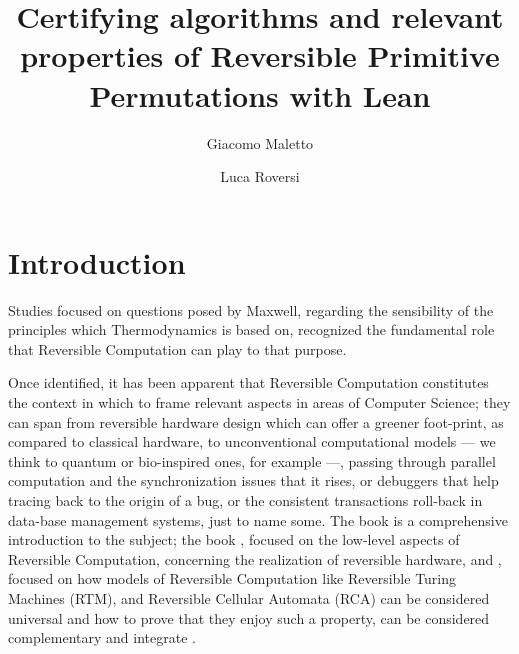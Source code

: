 \documentclass[runningheads]{llncs}
\newcommand{\RPP}{\textsf{RPP}\xspace}
\newcommand{\LEAN}{\textsf{Lean}\xspace}
\begin{document}
\title{Certifying algorithms and relevant properties of Reversible Primitive Permutations with \LEAN}
\titlerunning{Certifying \RPP properties with \LEAN}

\author{Giacomo Maletto \and
	    Luca Roversi}



\maketitle
\begin{abstract}
\end{abstract}

\section{Introduction}
\label{section:Introduction}
Studies focused on questions posed by Maxwell, regarding the sensibility of the principles which Thermodynamics is based on, recognized the fundamental role that Reversible Computation can play to that purpose.

Once identified, it has been apparent that Reversible Computation constitutes the context in which to frame relevant aspects in areas of Computer Science; they can span from reversible hardware design which can offer a greener foot-print, as compared to classical hardware, to unconventional computational models --- we think to quantum or bio-inspired ones, for example ---, passing through parallel computation and the synchronization issues that it rises, or debuggers that help tracing back to the origin of a bug, or the consistent transactions roll-back in data-base management systems, just to name some. The book \cite{perumalla2013chc} is a comprehensive introduction to the subject; the book \cite{DBLP:books/daglib/0025734}, focused on the low-level aspects of Reversible Computation, concerning the realization of reversible hardware, and
\cite{DBLP:series/eatcs/Morita17}, focused on how models of Reversible Computation like Reversible Turing Machines (RTM), and Reversible Cellular Automata (RCA) can be considered universal and how to prove that they enjoy such a property, can be considered complementary and integrate \cite{perumalla2013chc}.
\end{document}
